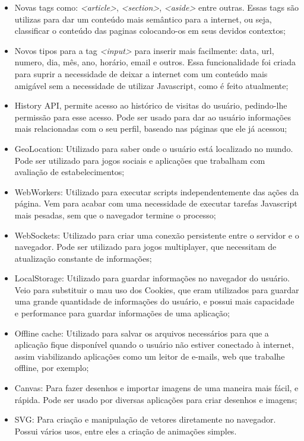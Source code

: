 \begin{itemize}
  \item Novas tags como: \textit{<article>}, \textit{<section>},
  \textit{<aside>} entre outras.
  Essas tags são utilizas para dar um conteúdo mais semântico para a
  internet, ou seja, classificar o conteúdo das paginas colocando-os
  em seus devidos contextos;
  \item Novos tipos para a tag \textit{<input>} para inserir mais facilmente:
  data, url, numero, dia, mês, ano, horário, email e outros. Essa
  funcionalidade foi criada para suprir a necessidade de deixar a
  internet com um conteúdo mais amigável sem a necessidade de utilizar
  Javascript, como é feito atualmente;
  \item History API, permite acesso ao histórico de visitas do usuário,
  pedindo-lhe permissão para esse acesso. Pode ser usado para dar ao
  usuário informações mais relacionadas com o seu perfil, baseado nas
  páginas que ele já acessou;
  \item GeoLocation: Utilizado para saber onde o usuário está localizado no
  mundo. Pode ser utilizado para jogos sociais e aplicações que
  trabalham com avaliação de estabelecimentos;
  \item WebWorkers: Utilizado para executar scripts independentemente das ações
  da página. Vem para acabar com uma necessidade de executar tarefas
  Javascript mais pesadas, sem que o navegador termine o processo;
  \item WebSockets: Utilizado para criar uma conexão persistente entre
  o servidor e o navegador. Pode ser utilizado para jogos multiplayer,
  que necessitam de atualização constante de informações;
  \item LocalStorage: Utilizado para guardar informações no navegador
  do usuário. Veio para substituir o mau uso dos Cookies, que eram
  utilizados para guardar uma grande quantidade de informações do
  usuário, e possui mais capacidade e performance para guardar
  informações de uma aplicação;
  \item Offline cache: Utilizado para salvar os arquivos necessários
  para que a aplicação fique disponível quando o usuário não estiver
  conectado à internet, assim viabilizando aplicações como um leitor
  de e-mails, web que trabalhe offline, por exemplo;
  \item Canvas: Para fazer desenhos e importar imagens de uma maneira
  mais fácil, e rápida. Pode ser usado por diversas aplicações para criar desenhos e
  imagens;
  \item SVG: Para criação e manipulação de vetores diretamente no
  navegador. Possui vários usos, entre eles a criação de animações
  simples.
\end{itemize}

